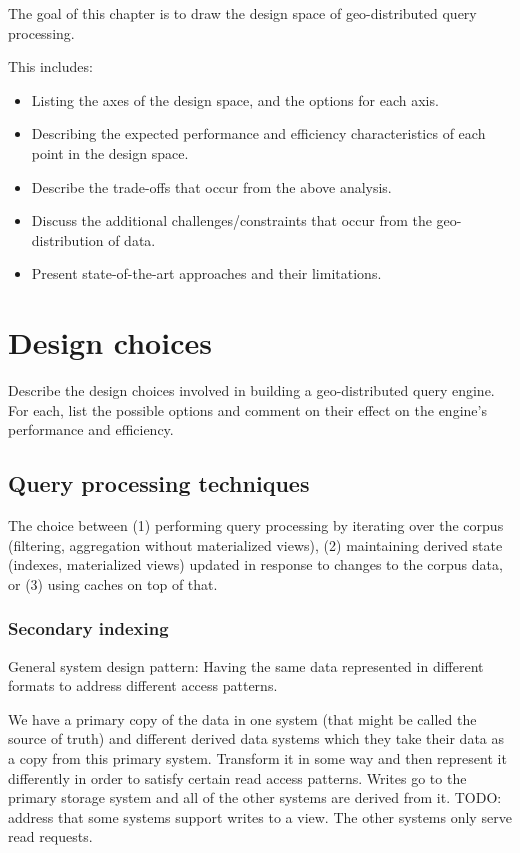 The goal of this chapter is to draw the design space of geo-distributed query processing.

This includes:
\begin{itemize}
  \item Listing the axes of the design space, and the options for each axis.
  \item Describing the expected performance and efficiency characteristics
  of each point in the design space.
  \item Describe the trade-offs that occur from the above analysis.
  \item Discuss the additional challenges/constraints that occur from the geo-
  distribution of data.
  \item Present state-of-the-art approaches and their limitations.
\end{itemize}

\section{Design choices}
Describe the design choices involved in building a geo-distributed query engine.
For each, list the possible options and comment on their effect on the engine's
performance and efficiency.


\subsection{Query processing techniques}

The choice between (1) performing query processing by iterating over the corpus
(filtering, aggregation without materialized views), (2) maintaining derived state
(indexes, materialized views) updated in response to changes to the corpus data,
or (3) using caches on top of that.

\subsubsection{Secondary indexing}

General system design pattern:
Having the same data represented in different formats to address different access patterns.

We have a primary copy of the data in one system (that might be called the source of truth)
and different derived data systems which they take their data as a copy from this
primary system.
Transform it in some way and then represent it differently
in order to satisfy certain read access patterns.
Writes go to the primary storage system and all of the other systems are derived from it.
TODO: address that some systems support writes to a view.
The other systems only serve read requests.


